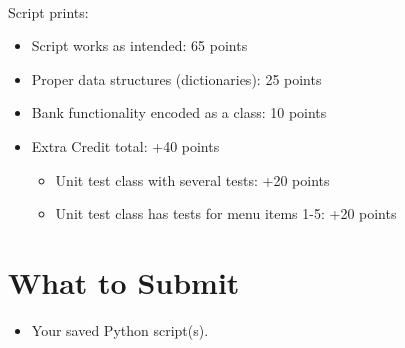\documentclass[letter,10pt]{article}
\begin{document}
    \paragraph{}Script prints:
    \begin{itemize}
        \item Script works as intended: 65 points
        \item Proper data structures (dictionaries): 25 points
        \item Bank functionality encoded as a class: 10 points
        \item Extra Credit total: +40 points
        \begin{itemize}
            \item Unit test class with several tests: +20 points
            \item Unit test class has tests for menu items 1-5: +20 points
        \end{itemize}
    \end{itemize}
    
    \section*{What to Submit}
    \begin{itemize}
        \item Your saved Python script(s).
    \end{itemize}
    
\end{document}
